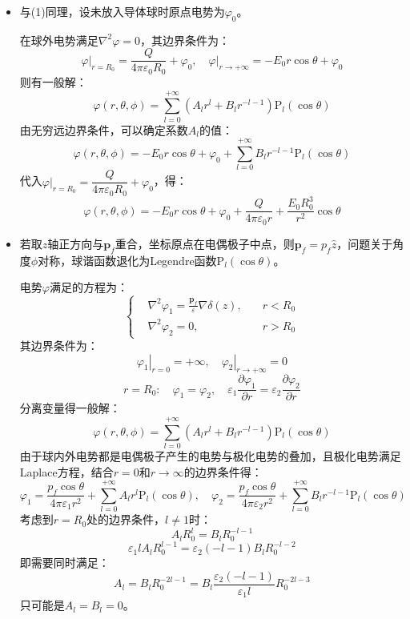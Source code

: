 \documentclass[a4paper,fontset=none]{ctexart}
\begin{document}
\begin{itemize}
        \item[2.(2)]
        与(1)同理，设未放入导体球时原点电势为$\varphi_0$。

        在球外电势满足$\nabla^2\varphi=0$，其边界条件为：
        \[
        \left.\varphi\right|_{r=R_0} = \frac{Q}{4\pi\varepsilon_0R_0} + \varphi_0,\quad
        \left.\varphi\right|_{r\to{+\infty}} = -E_0 r\cos\theta + \varphi_0
        \]
        则有一般解：
        \[
        \varphi(r,\theta,\phi) = \sum_{l=0}^{+\infty}\left(A_l r^l + B_l r^{-l-1}\right)\mathrm{P}_l(\cos\theta)
        \]
        由无穷远边界条件，可以确定系数$A_l$的值：
        \[
        \varphi(r,\theta,\phi) = -E_0 r\cos\theta + \varphi_0 + \sum_{l=0}^{+\infty}B_l r^{-l-1}\mathrm{P}_l(\cos\theta)
        \]
        代入$\left.\varphi\right|_{r=R_0}=\dfrac{Q}{4\pi\varepsilon_0R_0}+\varphi_0$，得：
        \[
        \varphi(r,\theta,\phi) = -E_0 r\cos\theta + \varphi_0 + \frac{Q}{4\pi\varepsilon_0r} + \frac{E_0R_0^3}{r^2}\cos\theta
        \]

        \item[4.]
        若取$z$轴正方向与$\bm{p}_f$重合，坐标原点在电偶极子中点，则$\bm{p}_f=p_f\hat{z}$，问题关于角度$\phi$对称，球谐函数退化为Legendre函数$\mathrm{P}_l(\cos\theta)$。

        电势$\varphi$满足的方程为：
        \[
        \left\{
            \begin{aligned}
                &\nabla^2\varphi_1 = \frac{\bm{p}_f}{\varepsilon}\nabla\delta(z),\quad &r<R_0 \\
                &\nabla^2\varphi_2 = 0,\quad &r>R_0
            \end{aligned}
        \right.
        \]
        其边界条件为：
        \[
        \left.\varphi_1\right|_{r=0} = +\infty,\quad
        \left.\varphi_2\right|_{r\to+\infty} = 0
        \]
        \[
        r = R_0:\quad \varphi_1 = \varphi_2,\quad \varepsilon_1\frac{\partial\varphi_1}{\partial r} = \varepsilon_2\frac{\partial\varphi_2}{\partial r}
        \]
        分离变量得一般解：
        \[
        \varphi(r,\theta,\phi) = \sum_{l=0}^{+\infty}\left(A_l r^l + B_l r^{-l-1}\right)\mathrm{P}_l(\cos\theta)
        \]
        由于球内外电势都是电偶极子产生的电势与极化电势的叠加，且极化电势满足Laplace方程，结合$r=0$和$r\to\infty$的边界条件得：
        \[
        \varphi_1 = \frac{p_f\cos\theta}{4\pi\varepsilon_1r^2} + \sum_{l=0}^{+\infty}A_l r^l\mathrm{P}_l(\cos\theta),\quad
        \varphi_2 = \frac{p_f\cos\theta}{4\pi\varepsilon_2r^2} + \sum_{l=0}^{+\infty}B_l r^{-l-1}\mathrm{P}_l(\cos\theta)
        \]
        考虑到$r=R_0$处的边界条件，$l\neq1$时：
        \[
        A_lR_0^l = B_lR_0^{-l-1}
        \]
        \[
        \varepsilon_1lA_lR_0^{l-1} = \varepsilon_2(-l-1)B_lR_0^{-l-2}
        \]
        即需要同时满足：
        \[
        A_l = B_lR_0^{-2l-1} = B_l\frac{\varepsilon_2(-l-1)}{\varepsilon_1l}R_0^{-2l-3}
        \]
        只可能是$A_l=B_l=0$。


\end{itemize}
\end{document}
